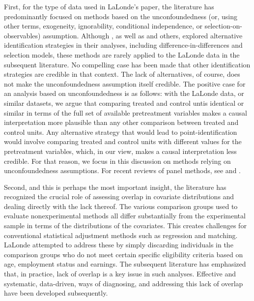 \documentclass[letterpaper,12pt,leqno]{article}
\begin{document}
First, for the type of data used in LaLonde's paper, the literature has predominantly focused on methods based on the unconfoundedness (or, using other terms, exogeneity, ignorability, conditional independence, or selection-on-observables) assumption. Although \citet{LaLonde}, as well as \citet{heckman1989choosing} and others, explored alternative identification strategies in their analyses, including difference-in-differences and selection models, these methods are rarely applied to the LaLonde data in the subsequent literature. No compelling case has been made that other identification strategies are credible in that context. 
The lack of alternatives, of course, does not make the unconfoundedness assumption itself credible. The positive case for an analysis based on unconfoundedness is as follows: with the LaLonde data, or similar datasets, we argue that comparing treated and control untis identical or similar in terms of the full set of available pretreatment variables makes a causal interpretation more plausible than any other comparison between treated and control units. Any alternative strategy that would lead to point-identification would involve comparing treated and control units with different values for the pretreatment variables, which, in our view, makes a causal interpretation less credible. For that reason, we focus in this discussion on methods relying on unconfoundedness assumptions. For recent reviews of panel methods, see \citet{xu2023causal} and \citet{arkhangelsky2023causal}. 

Second, and this is perhaps the most important insight, the literature has recognized the crucial role of assessing overlap in covariate distributions and dealing directly with the lack thereof.  The various comparison groups \citet{LaLonde} used to evaluate nonexperimental methods all differ substantially from the experimental sample in terms of the distributions of the covariates. This creates challenges for conventional statistical adjustment methods such as regression and matching. LaLonde attempted to address these by simply discarding individuals in the comparison groups who do not meet certain specific eligibility criteria based on age, employment status and earnings. The subsequent literature has emphasized that, in practice, lack of overlap is a key issue in such analyses. Effective and systematic, data-driven, ways of diagnosing, and addressing this lack of overlap have been developed subsequently.
\end{document}
